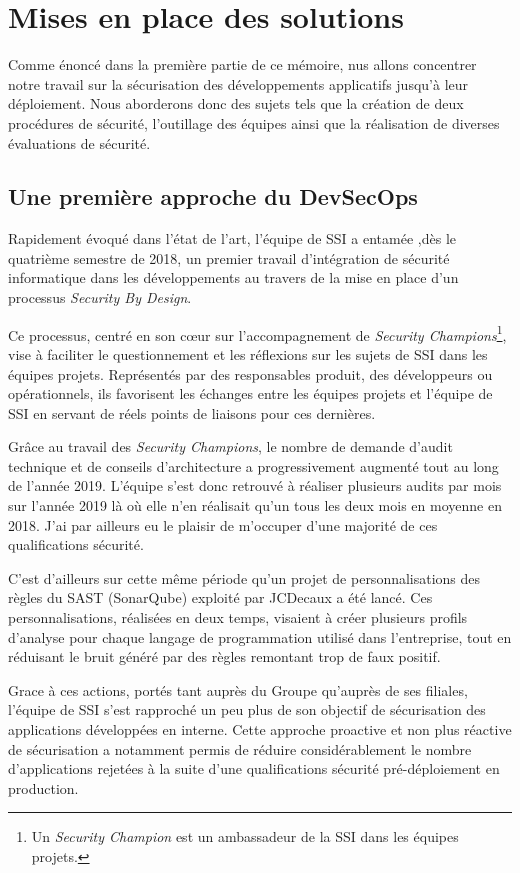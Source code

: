 \chapter{Mises en place des solutions}
Comme énoncé dans la première partie de ce mémoire, nus allons concentrer notre travail sur la sécurisation des 
développements applicatifs jusqu'à leur déploiement. Nous aborderons donc des sujets tels que la création de deux 
procédures de sécurité, l'outillage des équipes ainsi que la réalisation de diverses évaluations de sécurité.

\section{Une première approche du DevSecOps}
Rapidement évoqué dans l'état de l'art, l'équipe de \ac{SSI} a entamée ,dès le quatrième semestre de 2018, un premier 
travail d'intégration de sécurité informatique dans les développements au travers de la mise en place d'un processus 
\emph{Security By Design}.

Ce processus, centré en son cœur sur l'accompagnement de \emph{Security Champions}\footnote{Un 
\emph{Security Champion} est un ambassadeur de la \ac{SSI} dans les équipes projets.}, vise à faciliter le questionnement
et  les réflexions sur les sujets de \ac{SSI} dans les équipes projets. Représentés par des responsables produit, des 
développeurs ou opérationnels, ils favorisent les échanges entre les équipes projets et l'équipe de \ac{SSI} en servant 
de réels points de liaisons pour ces dernières.

Grâce au travail des \emph{Security Champions}, le nombre de demande d'audit technique et de conseils d'architecture
a progressivement augmenté tout au long de l'année 2019. L'équipe s'est donc retrouvé à réaliser plusieurs audits par 
mois sur l'année 2019 là où elle n'en réalisait qu'un tous les deux mois en moyenne en 2018. J'ai par ailleurs eu le 
plaisir de m'occuper d'une majorité de ces qualifications sécurité.

C'est d'ailleurs sur cette même période qu'un projet de personnalisations des règles du \ac{SAST} (SonarQube) exploité 
par JCDecaux a été lancé. Ces personnalisations, réalisées en deux temps, visaient à créer plusieurs profils d'analyse 
pour chaque langage de programmation utilisé dans l'entreprise, tout en réduisant le bruit généré par des règles 
remontant trop de faux positif.

Grace à ces actions, portés tant auprès du Groupe qu'auprès de ses filiales, l'équipe de \ac{SSI} s'est rapproché un peu
plus de son objectif de sécurisation des applications développées en interne. Cette approche proactive et non plus 
réactive de sécurisation a notamment permis de réduire considérablement le nombre d'applications rejetées à la suite d'une 
qualifications sécurité pré-déploiement en production.

